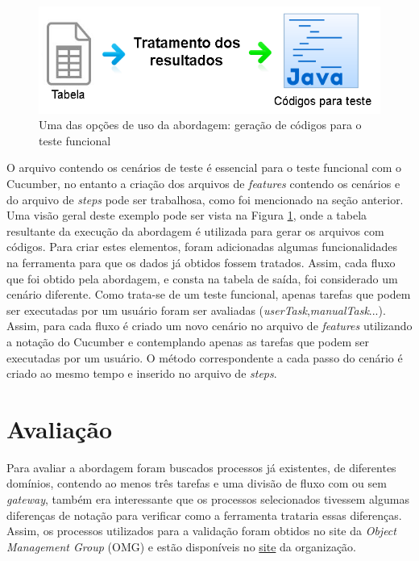 \documentclass[12pt]{article}
\begin{document}
\begin{figure}[ht]
\centering
\includegraphics[width=.9\textwidth]{figuras/abordagem2.png}
\caption{Uma das opções de uso da abordagem: geração de códigos para o teste funcional}
\label{fig:abordagem2}
\end{figure}

O arquivo contendo os cenários de teste é essencial para o teste funcional com o Cucumber, no entanto a criação dos arquivos de \emph{features} contendo os cenários e do arquivo de \emph{steps} pode ser trabalhosa, como foi mencionado na seção anterior. Uma visão geral deste exemplo pode ser vista na Figura \ref{fig:abordagem2}, onde a tabela resultante da execução da abordagem é utilizada para gerar os arquivos com códigos. Para criar estes elementos, foram adicionadas algumas funcionalidades na ferramenta para que os dados já obtidos fossem tratados. Assim, cada fluxo que foi obtido pela abordagem, e consta na tabela de saída, foi considerado um cenário diferente. Como trata-se de um teste funcional, apenas tarefas que podem ser executadas por um usuário foram ser avaliadas (\emph{userTask},\emph{manualTask}...). Assim, para cada fluxo é criado um novo cenário no arquivo de \emph{features} utilizando a notação do Cucumber e contemplando apenas as tarefas que podem ser executadas por um usuário. O método correspondente a cada passo do cenário é criado ao mesmo tempo e inserido no arquivo de \emph{steps}. %


\section{Avaliação}
Para avaliar a abordagem foram buscados processos já existentes, de diferentes domínios, contendo ao menos três tarefas e uma divisão de fluxo com ou sem \emph{gateway}, também era interessante que os processos selecionados tivessem algumas diferenças de notação para verificar como a ferramenta trataria essas diferenças. Assim, os processos utilizados para a validação foram obtidos no site da \emph{Object Management Group} (OMG) e estão disponíveis no \href{http://www.omg.org/spec/BPMN/20100602/2010-06-03/}{site} da organização.
\end{document}
